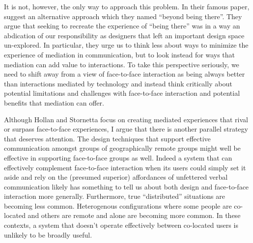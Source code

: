 \documentclass{tufte-handout}
\begin{document}
It is not, however, the only way to approach this problem. In their famous paper, \citet{Hollan:1992tz} suggest an alternative approach which they named ``beyond being there''. They argue that seeking to recreate the experience of ``being there'' was in a way an abdication of our responsibility as designers that left an important design space un-explored. In particular, they urge us to think less about ways to minimize the experience of mediation in communication, but to look instead for ways that mediation can add value to interactions. To take this perspective seriously, we need to shift away from a view of face-to-face interaction as being always better than interactions mediated by technology and instead think critically about potential limitations and challenges with face-to-face interaction and potential benefits that mediation can offer. 

Although Hollan and Stornetta focus on creating mediated experiences that rival or surpass face-to-face experiences, I argue that there is another parallel strategy that deserves attention. The design techniques that support effective communication amongst groups of geographically remote groups might well be effective in supporting face-to-face groups as well. Indeed a system that can effectively complement face-to-face interaction when its users could simply set it aside and rely on the (presumed superior) affordances of unfettered verbal communication likely has something to tell us about both design and face-to-face interaction more generally. Furthermore, true ``distributed'' situations are becoming less common. Heterogenous configurations where some people are co-located and others are remote and alone are becoming more common. In these contexts, a system that doesn't operate effectively between co-located users is unlikely to be broadly useful.




\end{document}
